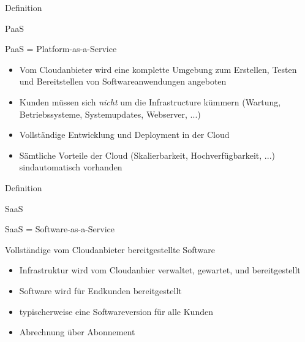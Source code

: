 \documentclass{scrartcl}
\newenvironment{flashcard}[2][]{%
    #1
    \vfill
    \centerline{\Large{#2}}
    \vfill
    \newpage
}
{\newpage}
\begin{document}
    \begin{flashcard}[Definition]{PaaS}
        PaaS = Platform-as-a-Service

        \begin{itemize}
            \item Vom Cloudanbieter wird eine komplette Umgebung zum Erstellen, Testen und Bereitstellen von Softwareanwendungen angeboten
            \item Kunden müssen sich \emph{nicht} um die Infrastructure kümmern\newline
            (Wartung, Betriebssysteme, Systemupdates, Webserver, ...)
            \item Vollständige Entwicklung und Deployment in der Cloud
            \item Sämtliche Vorteile der Cloud (Skalierbarkeit, Hochverfügbarkeit, ...) sind\newline automatisch vorhanden
        \end{itemize}
    \end{flashcard}

    \begin{flashcard}[Definition]{SaaS}
        SaaS = Software-as-a-Service

        Vollständige vom Cloudanbieter bereitgestellte Software
        \begin{itemize}
            \item Infrastruktur wird vom Cloudanbier verwaltet, gewartet, und bereitgestellt
            \item Software wird für Endkunden bereitgestellt
            \item typischerweise eine Softwareversion für alle Kunden
            \item Abrechnung über Abonnement
        \end{itemize}
    \end{flashcard}
\end{document}
